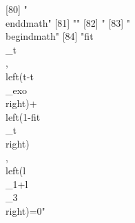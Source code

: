  [80] "\\end{dmath}"                                                                                                                                                                                                                                                                                                                                                                                                                                                                                
 [81] ""                                                                                                                                                                                                                                                                                                                                                                                                                                                                                            
 [82] "%
 [83] "\\begin{dmath}"                                                                                                                                                                                                                                                                                                                                                                                                                                                                              
 [84] "{{fit\\_t}}\\, \\left({t}-{{t\\_exo}}\\right)+\\left(1-{{fit\\_t}}\\right)\\, \\left({{l\\_1}}+{{l\\_3}}\\right)=0"                                                                                                                                                                                                                                                                                                                                                                          
